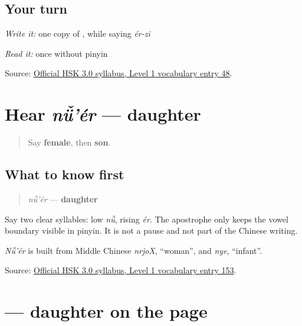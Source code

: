 \subsection*{Your turn}
\emph{Write it:} one copy of \textbf{}, while saying \emph{ér-zi}

\emph{Read it:} \textbf{} once without pinyin

\begin{tcolorbox}[breakable,colback=teal!4,colframe=teal!35!black,title={Before you move on}]
Source: \href{https://hsk.cn-bj.ufileos.com/3.0/\%E6\%96\%B0\%E7\%89\%88HSK\%E8\%80\%83\%E8\%AF\%95\%E5\%A4\%A7\%E7\%BA\%B21219.pdf}{Official HSK 3.0 syllabus, Level 1 vocabulary entry 48}.
\end{tcolorbox}
\section[nǚ'ér]{Hear \emph{nǚ'ér} — daughter}

\label{lesson:ZH-C12-hear-nuer}



\begin{quote}
Say \textbf{female}, then \textbf{son}.
\end{quote}

\subsection*{What to know first}
\begin{quote}
\emph{nǚ'ér} — \textbf{daughter}
\end{quote}

Say two clear syllables: low \emph{nǚ}, rising \emph{ér}. The apostrophe only keeps the vowel boundary visible in pinyin. It is not a pause and not part of the Chinese writing.

\emph{Nǚ'ér} is built from Middle Chinese \emph{nrjoX}, \textquotedblleft{}woman\textquotedblright{}, and \emph{nye}, \textquotedblleft{}infant\textquotedblright{}.

\begin{tcolorbox}[breakable,colback=teal!4,colframe=teal!35!black,title={Before you move on}]
Source: \href{https://hsk.cn-bj.ufileos.com/3.0/\%E6\%96\%B0\%E7\%89\%88HSK\%E8\%80\%83\%E8\%AF\%95\%E5\%A4\%A7\%E7\%BA\%B21219.pdf}{Official HSK 3.0 syllabus, Level 1 vocabulary entry 153}.
\end{tcolorbox}
\section[\texorpdfstring{\zh{女儿} (nǚ'ér)}{女儿 (nǚ'ér)}]{ — daughter on the page}

